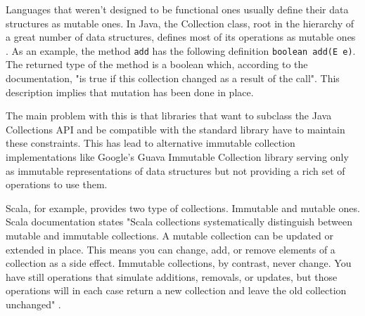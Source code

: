 \documentclass[../main.tex]{subfiles}
\begin{document}
Languages that weren't designed to be functional ones usually define their data
structures as mutable ones. In Java, the Collection class, root in the hierarchy
of a great number of data structures, defines most of its operations as mutable ones
\autocite{Collection}. As an example, the method \texttt{add} has the following definition
\texttt{boolean add(E e)}. The returned type of the method is a boolean which,
according to the documentation, "is true if this collection changed as a result
of the call". This description implies that mutation has been done in place.

The main problem with this is that libraries that want to subclass the Java
Collections API and be compatible with the standard library have to maintain
these constraints. This has lead to alternative immutable collection implementations like
Google's Guava Immutable Collection library \autocite{ImmutableCollectionAPI}
serving only as immutable representations of data structures but not providing a
rich set of operations to use them.

Scala, for example, provides two type of collections. Immutable and mutable ones.
Scala documentation states "Scala collections systematically distinguish between
mutable and immutable collections. A mutable collection can be updated or
extended in place. This means you can change, add, or remove elements of a
collection as a side effect. Immutable collections, by contrast, never change.
You have still operations that simulate additions, removals, or updates, but
those operations will in each case return a new collection and leave the old
collection unchanged" \autocite{MutableDocumentation}.
\end{document}
